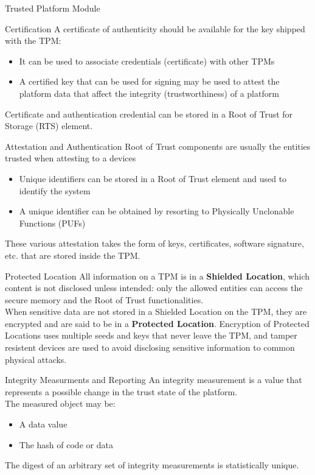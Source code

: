 \begin{section}{Trusted Platform Module}
  \begin{subsection}{Certification}
    A certificate of authenticity should be available for the key shipped with the TPM:
    \begin{itemize}
      \item It can be used to associate credentials (certificate) with other TPMs
      \item A certified key that can be used for signing may be used to attest the platform data
        that affect the integrity (trustworthiness) of a platform
    \end{itemize}
    Certificate and authentication credential can be stored in a Root of Trust for Storage (RTS)
    element.
  \end{subsection}

  \begin{subsection}{Attestation and Authentication}
    Root of Trust components are usually the entities trusted when attesting to a
    devices
    \begin{itemize}
      \item Unique identifiers can be stored in a Root of Trust element and used to identify the
        system
      \item A unique identifier can be obtained by resorting to Physically Unclonable Functions
        (PUFs)
    \end{itemize}
    These various attestation takes the form of keys, certificates, software signature, etc. that
    are stored inside the TPM.

  \end{subsection}
  \begin{subsection}{Protected Location}
    All information on a TPM is in a \textbf{Shielded Location}, which content is not disclosed
    unless intended: only the allowed entities can access the secure memory and the Root of Trust
    functionalities.\\
    When sensitive data are not stored in a Shielded Location on the TPM, they are encrypted and are
    said to be in a \textbf{Protected Location}. Encryption of Protected Locations uses multiple
    seeds and keys that never leave the TPM, and tamper resistent devices are used to avoid
    disclosing sensitive information to common physical attacks.
  \end{subsection}

  \begin{subsection}{Integrity Measurments and Reporting}
    An integrity measurement is a value that represents a possible change in the trust state of the
    platform.\\
    The measured object may be:
    \begin{itemize}
      \item A data value
      \item The hash of code or data
    \end{itemize}
    The digest of an arbitrary set of integrity measurements is statistically unique.
  \end{subsection}
\end{section}


